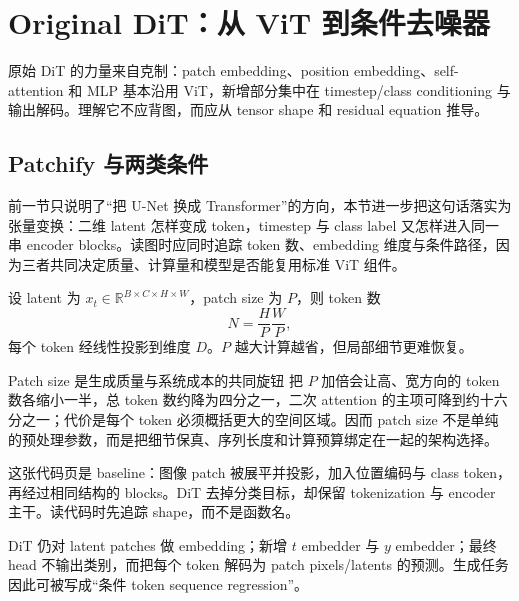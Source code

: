 \section{Original DiT：从 ViT 到条件去噪器}

原始 DiT 的力量来自克制：patch embedding、position embedding、self-attention 和 MLP 基本沿用 ViT，新增部分集中在 timestep/class conditioning 与输出解码。理解它不应背图，而应从 tensor shape 和 residual equation 推导。

\subsection{Patchify 与两类条件}

前一节只说明了“把 U-Net 换成 Transformer”的方向，本节进一步把这句话落实为张量变换：二维 latent 怎样变成 token，timestep 与 class label 又怎样进入同一串 encoder blocks。读图时应同时追踪 token 数、embedding 维度与条件路径，因为三者共同决定质量、计算量和模型是否能复用标准 ViT 组件。

设 latent 为 $x_t\in\mathbb R^{B\times C\times H\times W}$，patch size 为 $P$，则 token 数
\[
N=\frac{H}{P}\frac{W}{P},
\]
每个 token 经线性投影到维度 $D$。$P$ 越大计算越省，但局部细节更难恢复。

\begin{knowledgebox}{Patch size 是生成质量与系统成本的共同旋钮}
把 $P$ 加倍会让高、宽方向的 token 数各缩小一半，总 token 数约降为四分之一，二次 attention 的主项可降到约十六分之一；代价是每个 token 必须概括更大的空间区域。因而 patch size 不是单纯的预处理参数，而是把细节保真、序列长度和计算预算绑定在一起的架构选择。
\end{knowledgebox}


这张代码页是 baseline：图像 patch 被展平并投影，加入位置编码与 class token，再经过相同结构的 blocks。DiT 去掉分类目标，却保留 tokenization 与 encoder 主干。读代码时先追踪 shape，而不是函数名。


DiT 仍对 latent patches 做 embedding；新增 $t$ embedder 与 $y$ embedder；最终 head 不输出类别，而把每个 token 解码为 patch pixels/latents 的预测。生成任务因此可被写成“条件 token sequence regression”。


